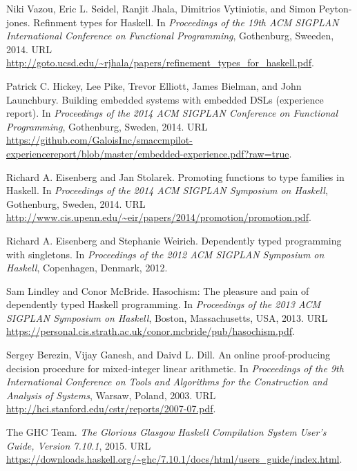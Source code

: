 \documentclass{sigplanconf}
\begin{document}
\begin{thebibliography}{}
{Niki Vazou}, {Eric L. Seidel}, {Ranjit Jhala}, {Dimitrios Vytiniotis}, and
  {Simon Peyton-jones}.
\newblock Refinment types for Haskell.
\newblock In \emph{Proceedings of the 19th ACM SIGPLAN International Conference
  on Functional Programming}, Gothenburg, Sweeden, 2014.
\newblock URL
  \url{http://goto.ucsd.edu/~rjhala/papers/refinement_types_for_haskell.pdf}.

{Patrick C. Hickey}, {Lee Pike}, {Trevor Elliott}, {James Bielman}, and {John
  Launchbury}.
\newblock Building embedded systems with embedded {DSLs} (experience report).
\newblock In \emph{Proceedings of the 2014 ACM SIGPLAN Conference on Functional
  Programming}, Gothenburg, Sweden, 2014.
\newblock URL
  \url{https://github.com/GaloisInc/smaccmpilot-experiencereport/blob/master/embedded-experience.pdf?raw=true}.

{Richard A. Eisenberg} and {Jan Stolarek}.
\newblock Promoting functions to type families in {Haskell}.
\newblock In \emph{Proceedings of the 2014 ACM SIGPLAN Symposium on {Haskell}},
  Gothenburg, Sweden, 2014.
\newblock URL
  \url{http://www.cis.upenn.edu/~eir/papers/2014/promotion/promotion.pdf}.

{Richard A. Eisenberg} and {Stephanie Weirich}.
\newblock Dependently typed programming with singletons.
\newblock In \emph{Proceedings of the 2012 ACM SIGPLAN Symposium on {Haskell}},
  Copenhagen, Denmark, 2012.

{Sam Lindley} and {Conor McBride}.
\newblock Hasochism: The pleasure and pain of dependently typed {Haskell}
  programming.
\newblock In \emph{Proceedings of the 2013 ACM SIGPLAN Symposium on {Haskell}},
  Boston, Massachusetts, USA, 2013.
\newblock URL
  \url{https://personal.cis.strath.ac.uk/conor.mcbride/pub/hasochism.pdf}.

{Sergey Berezin}, {Vijay Ganesh}, and {Daivd L. Dill}.
\newblock An online proof-producing decision procedure for mixed-integer linear
  arithmetic.
\newblock In \emph{Proceedings of the 9th International Conference on Tools and
  Algorithms for the Construction and Analysis of Systems}, Warsaw, Poland,
  2003.
\newblock URL \url{http://hci.stanford.edu/cstr/reports/2007-07.pdf}.

{The GHC Team}.
\newblock \emph{The Glorious Glasgow Haskell Compilation System User's Guide,
  Version 7.10.1}, 2015.
\newblock URL
  \url{https://downloads.haskell.org/~ghc/7.10.1/docs/html/users_guide/index.html}.

\end{thebibliography}
\end{document}
